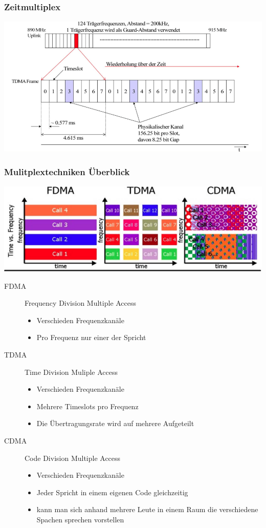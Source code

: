 \subsubsection{Zeitmultiplex}

\includegraphics[width = 0.5 \linewidth]{./Pics/GSMRahmenstruktur}

\subsubsection{Mulitplextechniken Überblick}
\includegraphics[width = 0.5 \linewidth]{./Pics/GSMMuxTechniken}

\begin{description}
	\item[FDMA] Frequency Division Multiple Access
	\begin{itemize}
		\item Verschieden Frequenzkanäle
		\item Pro Frequenz nur einer der Spricht
	\end{itemize}
	\item[TDMA] Time Division Muliple Access
	\begin{itemize}
		\item Verschieden Frequenzkanäle
		\item Mehrere Timeslots pro Frequenz
		\item Die Übertragungsrate wird auf mehrere Aufgeteilt
	\end{itemize}
	\item[CDMA] Code Division Multiple Access
	\begin{itemize}
		\item Verschieden Frequenzkanäle
		\item Jeder Spricht in einem eigenen Code gleichzeitig
		\item kann man sich anhand mehrere Leute in einem Raum die verschiedene Spachen sprechen vorstellen
	\end{itemize}
\end{description}

